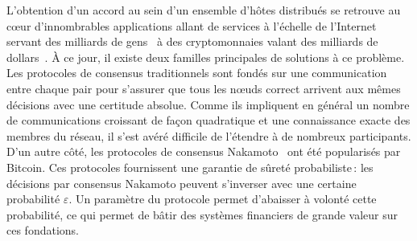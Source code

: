 \documentclass[a4,twocolumn,10pt]{article}
\theoremstyle{definition}
\begin{document}
L'obtention d'un accord au sein d'un ensemble d'hôtes distribués se retrouve au cœur d'innombrables applications allant de services à l'échelle de l'Internet servant des milliards de gens~\cite{Burrows06,HuntKJR10} à des cryptomonnaies valant des milliards de dollars~\cite{marketcapcryptocurrency}.
À ce jour, il existe deux familles principales de solutions à ce problème.
Les protocoles de consensus traditionnels
sont fondés sur une communication entre chaque pair pour s'assurer que tous les nœuds correct arrivent aux mêmes décisions avec une certitude absolue.
Comme ils impliquent en général un nombre de communications croissant de façon quadratique et une connaissance exacte des membres du réseau, il s'est avéré difficile de l'étendre
à de nombreux participants.
D'un autre côté, les protocoles de consensus Nakamoto~\cite{nakamoto2008bitcoin,GarayKL15, PassSS17, SompolinskyZ15, SompolinskyLZ16, SompolinskyZ18, BentovHMN17, EyalGSR16,Kokoris-KogiasJ16,PassS16a, PassS18} ont été popularisés par Bitcoin.
Ces protocoles fournissent une garantie de sûreté probabiliste\,: les décisions par consensus Nakamoto peuvent s'inverser avec une certaine probabilité $\varepsilon$.
Un paramètre du protocole permet d'abaisser à volonté cette probabilité, ce qui permet de bâtir des systèmes financiers de grande valeur sur ces fondations.
\end{document}
